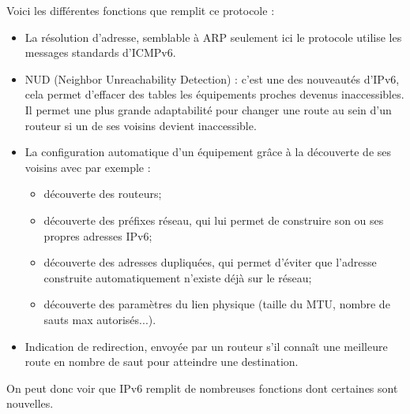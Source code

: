 Voici les différentes fonctions que remplit ce protocole :
\begin{itemize}
  \item La résolution d’adresse, semblable à ARP seulement ici le protocole utilise les messages standards d’ICMPv6.
  \item NUD (Neighbor Unreachability Detection) : c’est une des nouveautés d’IPv6, cela permet d’effacer des tables les équipements proches devenus inaccessibles. Il permet une plus grande adaptabilité pour changer une route au sein d’un routeur si un de ses voisins devient inaccessible.
  \item La configuration automatique d’un équipement grâce à la découverte de ses voisins avec par exemple :
    \begin{itemize}
      \item découverte des routeurs;
      \item découverte des préfixes réseau, qui lui permet de construire son ou ses propres adresses IPv6;
      \item découverte des adresses dupliquées, qui permet d’éviter que l’adresse construite automatiquement n’existe déjà sur le réseau;
      \item découverte des paramètres du lien physique (taille du MTU, nombre de sauts max autorisés...).
    \end{itemize}
  \item	Indication de redirection, envoyée par un routeur s’il connaît une meilleure route en nombre de saut pour atteindre une destination.
\end{itemize}On peut donc voir que IPv6 remplit de nombreuses fonctions dont certaines sont nouvelles.

